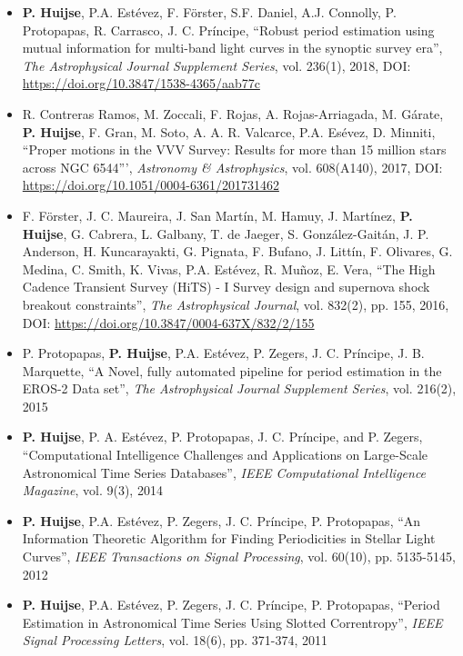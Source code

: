 \documentclass[letterpaper,11pt]{article}
\newcommand{\compactlist}{\setlength{\parskip}{0pt} \setlength{\leftskip}{2em}}
\begin{document}
\begin{enumerate}[I]
	\begin{itemize}  \compactlist{}
        \item \textbf{P. Huijse}, P.A. Est\'evez, F. F\"orster, S.F. Daniel, A.J. Connolly, P. Protopapas, R. Carrasco, J. C. Pr\'incipe, ``Robust period estimation using mutual information for multi-band light curves in the synoptic survey era'', \emph{The Astrophysical Journal Supplement Series}, vol. 236(1), 2018, DOI: \url{https://doi.org/10.3847/1538-4365/aab77c}
        \item  R. Contreras Ramos, M. Zoccali, F. Rojas, A. Rojas-Arriagada, M. G\'arate, \textbf{P. Huijse}, F. Gran, M. Soto, A. A. R. Valcarce, P.A. Es\'evez, D. Minniti, ``Proper motions in the VVV Survey: Results for more than 15 million stars across NGC 6544''', \emph{Astronomy \& Astrophysics}, vol. 608(A140), 2017, DOI: \url{https://doi.org/10.1051/0004-6361/201731462}
        \item F. F\"orster, J. C. Maureira, J. San Mart\'in, M. Hamuy, J. Mart\'inez, \textbf{P. Huijse}, G. Cabrera, L. Galbany, T. de Jaeger, S. González-Gait\'an, J. P. Anderson, H. Kuncarayakti, G. Pignata, F. Bufano, J. Litt\'in, F. Olivares, G. Medina, C. Smith, K. Vivas, P.A. Est\'evez, R. Muñoz, E. Vera, ``The High Cadence Transient Survey (HiTS) - I Survey design and supernova shock breakout constraints'', \emph{The Astrophysical Journal}, vol. 832(2), pp. 155, 2016, DOI: \url{https://doi.org/10.3847/0004-637X/832/2/155}
        \item P. Protopapas, \textbf{P. Huijse}, P.A. Estévez, P. Zegers, J. C. Príncipe, J. B. Marquette, ``A Novel, fully automated pipeline for period estimation in the {EROS}-2 Data set'', \emph{The Astrophysical Journal Supplement Series}, vol. 216(2), 2015
        \item \textbf{P. Huijse}, P. A. Estévez, P. Protopapas, J. C. Príncipe, and P. Zegers, ``Computational Intelligence Challenges and Applications on Large-Scale Astronomical Time Series Databases'', \emph{IEEE Computational Intelligence Magazine}, vol. 9(3), 2014
        \item  \textbf{P. Huijse}, P.A. Estévez, P. Zegers, J. C. Príncipe, P. Protopapas, ``An Information Theoretic Algorithm for Finding Periodicities in Stellar Light Curves'', \emph{IEEE Transactions on Signal Processing}, vol. 60(10), pp. 5135-5145, 2012
        \item \textbf{P. Huijse}, P.A. Estévez, P. Zegers, J. C. Príncipe, P. Protopapas, ``Period Estimation in Astronomical Time Series Using Slotted Correntropy'', \emph{IEEE Signal Processing Letters}, vol. 18(6), pp. 371-374, 2011
	\end{itemize}



\end{enumerate}
\end{document}
